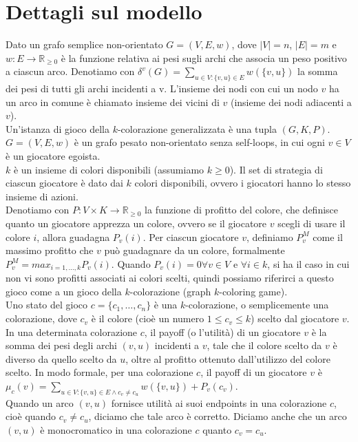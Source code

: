 \section{Dettagli sul modello}
\justify
Dato un grafo semplice non-orientato \(G = (V, E, w)\), dove \(|V| = n\), \(|E| = m\) e \(w : E\rightarrow\mathds{R}_{\geq 0}\) è la funzione relativa ai pesi sugli archi che associa un peso positivo a ciascun arco. Denotiamo con \(\delta^v (G) = \sum_{u \in V : \{v, u\} \in E} w(\{v, u\})\) la somma dei pesi di tutti gli archi incidenti a v. L'insieme dei nodi con cui un nodo \(v\) ha un arco in comune è chiamato insieme dei vicini di \(v\) (insieme dei nodi adiacenti a \(v\)).\\
Un'istanza di gioco della \(k\)-colorazione generalizzata è una tupla \((G, K, P)\). \(G = (V, E, w)\) è un grafo pesato non-orientato senza self-loops, in cui ogni \(v \in V\) è un giocatore egoista.\\
\(k\) è un insieme di colori disponibili (assumiamo \(k \geq 0\)). Il set di strategia di ciascun giocatore è dato dai \(k\) colori disponibili, ovvero i giocatori hanno lo stesso insieme di azioni.\\
Denotiamo con \(P : V \times K \rightarrow \mathds{R}_{\geq 0}\) la funzione di profitto del colore, che definisce quanto un giocatore apprezza un colore, ovvero se il giocatore \(v\) scegli di usare il colore \(i\), allora guadagna \(P_v (i)\). Per ciascun giocatore \(v\), definiamo \(P_v^M\) come il massimo profitto che \(v\) può guadagnare da un colore, formalmente \(P_v^M = max_{i=1,\ldots,k} P_v (i)\). Quando \(P_v (i) = 0 \forall v \in V\) e \(\forall i \in k\), si ha il caso in cui non vi sono profitti associati ai colori scelti, quindi possiamo riferirci a questo gioco come a un gioco della \(k\)-colorazione (graph \(k\)-coloring game).\\
Uno stato del gioco \(c = \{c_1,\ldots,c_n\}\) è una \(k\)-colorazione, o semplicemente una colorazione, dove \(c_v\) è il colore (cioè un numero \(1 \leq c_v \leq k\)) scelto dal giocatore \(v\). In una determinata colorazione \(c\), il payoff (o l'utilità) di un giocatore \(v\) è la somma dei pesi degli archi \((v, u)\) incidenti a \(v\), tale che il colore scelto da \(v\) è diverso da quello scelto da \(u\), oltre al profitto ottenuto dall'utilizzo del colore scelto. In modo formale, per una colorazione \(c\), il payoff di un giocatore \(v\) è \(\mu_c (v) = \sum_{u \in V:\{v, u\} \in E \wedge c_v \neq c_u} w(\{v, u\}) + P_v(c_v)\).\\
Quando un arco \((v, u)\) fornisce utilità ai suoi endpoints in una colorazione \(c\), cioè quando \(c_v \neq c_u\), diciamo che tale arco è corretto. Diciamo anche che un arco \((v, u)\) è monocromatico in una colorazione \(c\) quanto \(c_v = c_u\).\\
